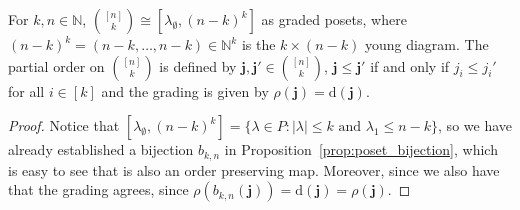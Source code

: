 \begin{proposition} For $k,n\in\mathbb{N}$, $\binom{[n]}{k}\cong[\lambda_{\emptyset},(n-k)^k]$ as graded posets, where $(n-k)^k=(n-k,\ldots,n-k)\in\mathbb{N}^k$ is the $k\times(n-k)$ young diagram. The partial order on $\binom{[n]}{k}$ is defined by $\mathbf{j},\mathbf{j}'\in\binom{[n]}{k}$, $\mathbf{j}\leq\mathbf{j}'$ if and only if $j_i\leq j_i'$ for all $i\in[k]$ and the grading is given by $\rho(\mathbf{j})=\mathrm{d}(\mathbf{j})$.
\end{proposition}
\begin{proof} Notice that $[\lambda_{\emptyset},(n-k)^k]=\{\lambda\in P:|\lambda|\leq k\text{ and }\lambda_1\leq n-k\}$, so we have already established a bijection $b_{k,n}$ in Proposition~\ref{prop:poset_bijection}, which is easy to see that is also an order preserving map. Moreover, since we also have that the grading agrees, since $\rho(b_{k,n}(\mathbf{j}))=\mathrm{d}(\mathbf{j})=\rho(\mathbf{j})$.
\end{proof}


